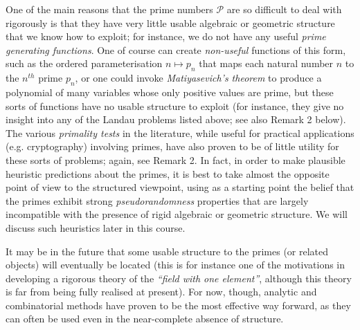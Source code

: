 \documentclass[10pt,reqno]{amsart}
\begin{document}
One of the main reasons that the prime numbers ${{\mathcal P}}$ are so difficult to deal with rigorously is that they have very little usable algebraic or geometric structure that we know how to exploit; for instance, we do not have any useful \emph{prime generating functions}. One of course can create \emph{non-useful} functions of this form, such as the ordered parameterisation ${n \mapsto p_n}$ that maps each natural number ${n}$ to the ${n^{th}}$ prime ${p_n}$, or one could invoke \emph{Matiyasevich’s theorem} to produce a polynomial of many variables whose only positive values are prime, but these sorts of functions have no usable structure to exploit (for instance, they give no insight into any of the Landau problems listed above; see also Remark 2 below). The various \emph{primality tests} in the literature, while useful for practical applications (e.g. cryptography) involving primes, have also proven to be of little utility for these sorts of problems; again, see Remark 2. In fact, in order to make plausible heuristic predictions about the primes, it is best to take almost the opposite point of view to the structured viewpoint, using as a starting point the belief that the primes exhibit strong \emph{pseudorandomness} properties that are largely incompatible with the presence of rigid algebraic or geometric structure. We will discuss such heuristics later in this course.

It may be in the future that some usable structure to the primes (or related objects) will eventually be located (this is for instance one of the motivations in developing a rigorous theory of the \emph{``field with one element''}, although this theory is far from being fully realised at present). For now, though, analytic and combinatorial methods have proven to be the most effective way forward, as they can often be used even in the near-complete absence of structure.
\end{document}
